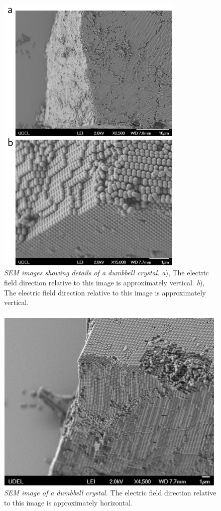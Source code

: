 \begin{figure}[htbp]
\centering
\includegraphics[width=0.8\textwidth]{figures/CsuppFigure4.pdf}
\caption{\label{fig:crystalSEM2} \emph{SEM images showing details of a dumbbell crystal.}
	\emph{a}), The electric field direction relative to this image is approximately vertical.
	\emph{b}), The electric field direction relative to this image is approximately vertical.}
\end{figure}

\begin{figure}[htbp]
\centering
\includegraphics[width=1.0\textwidth]{figures/CsuppFigure5.pdf}
\caption{\label{fig:crystalSEM3} \emph{SEM image of a dumbbell crystal.}
	The electric field direction relative to this image is approximately horizontal.}
\end{figure}

